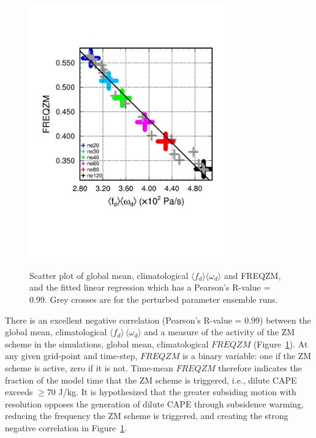 \documentclass[times]{qjrms4}
\begin{document}
\begin{figure}
\begin{center}
\noindent\includegraphics[width=20pc,angle=0]{figs/temp_diags_corr.pdf}\\
\end{center}
\caption{Scatter plot of global mean, climatological $\langle f_{d} \rangle \langle \omega_{d} \rangle$ and FREQZM, and the fitted linear regression which has a Pearson's R-value = 0.99. Grey crosses are for the perturbed parameter ensemble runs.}
\label{fig:corr}
\end{figure}

There is an excellent negative correlation (Pearson's R-value = 0.99) between the global mean, climatological $\langle f_{d} \rangle \, \langle \omega_{d} \rangle$ and a measure of the activity of the ZM scheme in the simulations, global mean, climatological $FREQZM$ (Figure~\ref{fig:corr}). At any given grid-point and time-step, $FREQZM$ is a binary variable: one if the ZM scheme is active, zero if it is not. Time-mean $FREQZM$ therefore indicates the fraction of the model time that the ZM scheme is triggered, i.e., dilute CAPE exceeds $\geq 70$ J/kg. It is hypothesized that the greater subsiding motion with resolution opposes the generation of dilute CAPE through subsidence warming, reducing the frequency the ZM scheme is triggered, and creating the strong negative correlation in Figure~\ref{fig:corr}.
\end{document}
